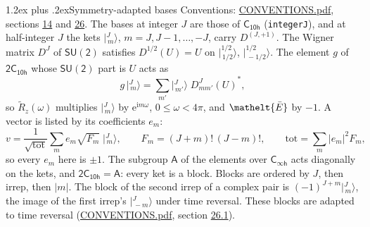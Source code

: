 \documentclass[10pt,a4paper]{article}
\makeatletter
\renewcommand\section{\@startsection{section}{1}{\z@}{-3ex plus -1ex minus -.2ex}%
  {1.2ex plus .2ex}{\normalfont\large\sffamily\bfseries\color{parttitle}}}
\numberwithin{equation}{section}
\newcommand{\eltfont}[1]{{\let\sigma\eltsigma\mathelt{#1}}}
\newcommand{\grp}[1]{\mathsf{#1}}
\newcommand{\elt}[1]{\eltfont{#1}}
\newcommand{\iunit}{\mathrm{i}}
\newcommand{\expe}{\mathrm{e}}
\newcommand{\irrJp}[2]{D^{(#1,#2)}}
\newcommand{\wignerD}[1]{D^{#1}}
\newcommand{\conj}[1]{{#1}^{*}}
\newcommand{\jm}[2]{\bigl\lvert{}^{#1}_{\,#2}\bigr\rangle}
\newcommand{\barred}[1]{\bar{#1}}
\newcommand{\lift}[1]{\tilde{#1}}
\makeatother
\begin{document}
\section{Symmetry-adapted bases}\label{s:bases}
Conventions: \href{../../CONVENTIONS.pdf}{CONVENTIONS.pdf}, sections \href{../../../rotation/CONVENTIONS.pdf\#conv.14}{14} and \href{../../CONVENTIONS.pdf\#conv.26}{26}.
\leavevmode\label{n:index.m}\label{n:vector.ket}The bases at integer $J$ are those of \href{../../../rotation/data/pdf/C10h.pdf}{$\grp{C_{10h}}$} (\texttt{integerJ}), and at half-integer $J$ the kets $\jm{J}{m}$, $m = J, J-1, \dots, -J$, carry $\irrJp{J}{+1}$. \label{n:matrix.wigner}The Wigner matrix $\wignerD{J}$ of $\grp{SU(2)}$ satisfies $\wignerD{1/2}(U) = U$ on $\jm{1/2}{1/2}$, $\jm{1/2}{-1/2}$. The element $g$ of $\grp{2C_{10h}}$ whose $\grp{SU(2)}$ part is $U$ acts as
\begin{equation}\label{e:action}g\,\jm{J}{m} = \sum_{m'} \jm{J}{m'}\; \conj{\wignerD{J}_{m m'}(U)},\end{equation}
so $\lift{R}_{z}(\omega)$ multiplies $\jm{J}{m}$ by $\expe^{\iunit m\omega}$, $0 \le \omega < 4\pi$, and $\elt{\barred{E}}$ by $-1$. \label{n:index.ketcoefficient}\label{n:vector.basis.symmetry}\label{n:index.ketweight}\label{n:index.total}A vector is listed by its coefficients $e_m$:
\begin{equation}\label{e:ket}v = \frac{1}{\sqrt{\mathrm{tot}}}\sum_m e_m\sqrt{F_m}\;\jm{J}{m},\qquad F_m = (J+m)!\,(J-m)!,\qquad \mathrm{tot} = \sum_m |e_m|^2F_m,\end{equation}
so every $e_m$ here is $\pm 1$.
\leavevmode\label{n:group.A}The subgroup $\grp{A}$ of the elements over $\grp{C_{\infty h}}$ acts diagonally on the kets, and $\grp{2C_{10h}} = \grp{A}$: every ket is a block. Blocks are ordered by $J$, then irrep, then $|m|$. The block of the second irrep of a complex pair is $(-1)^{J+m}\jm{J}{m}$, the image of the first irrep's $\jm{J}{-m}$ under time reversal. These blocks are adapted to time reversal (\href{../../CONVENTIONS.pdf}{CONVENTIONS.pdf}, section \href{../../CONVENTIONS.pdf\#conv.26.1}{26.1}).
\end{document}
